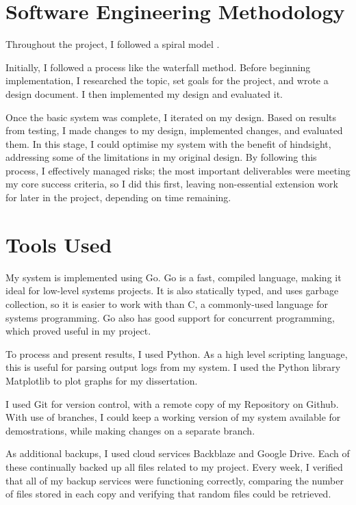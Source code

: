 \documentclass[12pt,a4paper,twoside,openany]{report}
\begin{document}
\section{Software Engineering Methodology}

Throughout the project, I followed a spiral model \cite{boehm1988spiral}.

Initially, I followed a process like the waterfall method. Before beginning implementation, I researched the topic, set goals for the project, and wrote a design document. I then implemented my design and evaluated it.

Once the basic system was complete, I iterated on my design. Based on results from testing, I made changes to my design, implemented changes, and evaluated them. In this stage, I could optimise my system with the benefit of hindsight, addressing some of the limitations in my original design. By following this process, I effectively managed risks; the most important deliverables were meeting my core success criteria, so I did this first, leaving non-essential extension work for later in the project, depending on time remaining.

\section{Tools Used}

My system is implemented using Go. Go is a fast, compiled language, making it ideal for low-level systems projects. It is also statically typed, and uses garbage collection, so it is easier to work with than C, a commonly-used language for systems programming. Go also has good support for concurrent programming, which proved useful in my project.

To process and present results, I used Python. As a high level scripting language, this is useful for parsing output logs from my system. I used the Python library Matplotlib to plot graphs for my dissertation.

I used Git for version control, with a remote copy of my Repository on Github. With use of branches, I could keep a working version of my system available for demostrations, while making changes on a separate branch.

As additional backups, I used cloud services Backblaze and Google Drive. Each of these continually backed up all files related to my project. Every week, I verified that all of my backup services were functioning correctly, comparing the number of files stored in each copy and verifying that random files could be retrieved.
\end{document}
